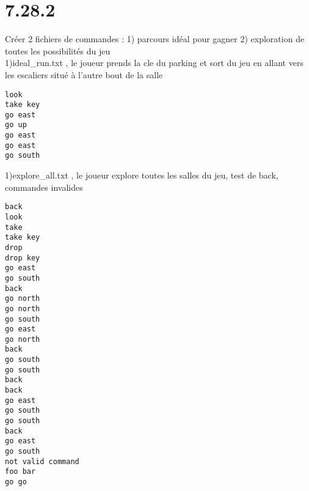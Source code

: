 \documentclass[a4paper , 10pt]{article}
\begin{document}
\section{7.28.2}
\quad Créer 2 fichiers de commandes : 1) parcours idéal pour gagner 2) exploration de toutes les possibilités du jeu \\
1)ideal\_run.txt , le joueur prends la cle du parking et sort du jeu en allant vers les escaliers situé à l'autre bout de la salle
\begin{verbatim}
look
take key
go east
go up
go east
go east
go south
\end{verbatim}
1)explore\_all.txt , le joueur explore toutes les salles du jeu, test de back, commandes invalides
\begin{verbatim}
back
look
take
take key
drop
drop key
go east
go south
back
go north
go north
go south
go east
go north
back
go south
go south
back
back
go east
go south
go south
back
go east
go south
not valid command
foo bar
go go

\end{verbatim}
\end{document}
